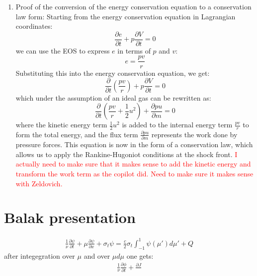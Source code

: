 \documentclass[11pt]{article}
\begin{document}
\begin{enumerate}
  \begin{equation}
    \dot{y}_s (\bm{u}_2 - \bm{u}_1) = \bm{f}(\bm{u}_2) - \bm{f}(\bm{u}_1)
  \end{equation}
  \item Proof of the conversion of the energy conservation equation to a conservation law form: Starting from the energy conservation equation in Lagrangian coordinates:
  \begin{equation}
    \frac{\partial e}{\partial t} + p \frac{\partial V}{\partial t} = 0
  \end{equation}
  we can use the EOS to express $e$ in terms of $p$ and $v$:
  \begin{equation}
    e = \frac{p v}{r}
  \end{equation}
  Substituting this into the energy conservation equation, we get:
  \begin{equation}
    \frac{\partial}{\partial t} \left(\frac{p v}{r}\right) + p \frac{\partial V}{\partial t} = 0
  \end{equation}
  which under the assumption of an ideal gas can be rewritten as:
  \begin{equation}
    \frac{\partial}{\partial t} \left(\frac{p v}{r} + \frac{1}{2} u^2\right) + \frac{\partial pu}{\partial m} = 0
  \end{equation}
  where the kinetic energy term $\frac{1}{2} u^2$ is added to the internal energy term $\frac{p v}{r}$ to form the total energy, and the flux term $\frac{\partial pu}{\partial m}$ represents the work done by pressure forces. This equation is now in the form of a conservation law, which allows us to apply the Rankine-Hugoniot conditions at the shock front. \textcolor{red}{I actually need to make sure that it makes sense to add the kinetic energy and transform the work term as the copilot did. Need to make sure it makes sense with Zeldovich.}
\end{enumerate}
\section{Balak presentation}
\begin{align}
\frac{1}{\nu} \frac{\partial \psi}{\partial t} + \mu \frac{\partial \psi}{\partial x} + \sigma_t \psi = \frac{c}{2} \sigma_t \int_{-1}^{1} \psi(\mu') d\mu' + Q
\end{align}
after integegration over $\mu$ and over $\mu d\mu$ one gets:
\begin{align}
\frac{1}{\nu} \frac{\partial \phi}{\partial t}+\frac{\partial J}{}
\end{align}
\end{document}
